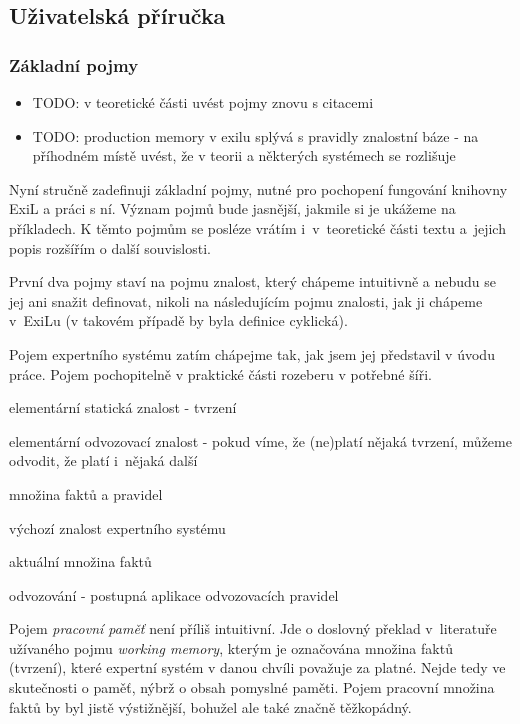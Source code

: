 \subsection{Uživatelská příručka}
\subsubsection{Základní pojmy}
\begin{framed}
  \begin{itemize}
    \item TODO: v teoretické části uvést pojmy znovu s citacemi
    \item TODO: production memory v exilu splývá s pravidly znalostní báze - na
      příhodném místě uvést, že v teorii a některých systémech se rozlišuje
  \end{itemize}
\end{framed}

Nyní stručně zadefinuji základní pojmy, nutné pro pochopení fungování knihovny
ExiL a práci s ní. Význam pojmů bude jasnější, jakmile si je ukážeme na
příkladech. K těmto pojmům se posléze vrátím i~v~teoretické části textu
a~jejich popis rozšířím o další souvislosti.

První dva pojmy staví na pojmu znalost, který chápeme intuitivně a nebudu se jej
ani snažit definovat, nikoli na následujícím pojmu znalosti, jak ji chápeme
v~ExiLu (v takovém případě by byla definice cyklická).

Pojem expertního systému zatím chápejme tak, jak jsem jej představil v úvodu
práce. Pojem pochopitelně v praktické části rozeberu v potřebné šíři.
\begin{description}[leftmargin=6cm,style=sameline,align=right,labelsep=0.5cm]
  \item[fakt] elementární statická znalost - tvrzení
  \item[(odvozovací) pravidlo] elementární odvozovací znalost - pokud víme, že
    (ne)platí nějaká tvrzení, můžeme odvodit, že platí i~nějaká další
  \item[znalost (v ExiLu)] množina faktů a pravidel
  \item[znalostní báze] výchozí znalost expertního systému
  \item[pracovní paměť] aktuální množina faktů
  \item[inference] odvozování - postupná aplikace odvozovacích pravidel
\end{description}
Pojem \emph{pracovní paměť} není příliš intuitivní. Jde o doslovný překlad
v~literatuře užívaného pojmu \emph{working memory}, kterým je označována množina
faktů (tvrzení), které expertní systém v danou chvíli považuje za platné. Nejde
tedy ve skutečnosti o paměť, nýbrž o obsah pomyslné paměti. Pojem pracovní
množina faktů by byl jistě výstižnější, bohužel ale také značně těžkopádný.


